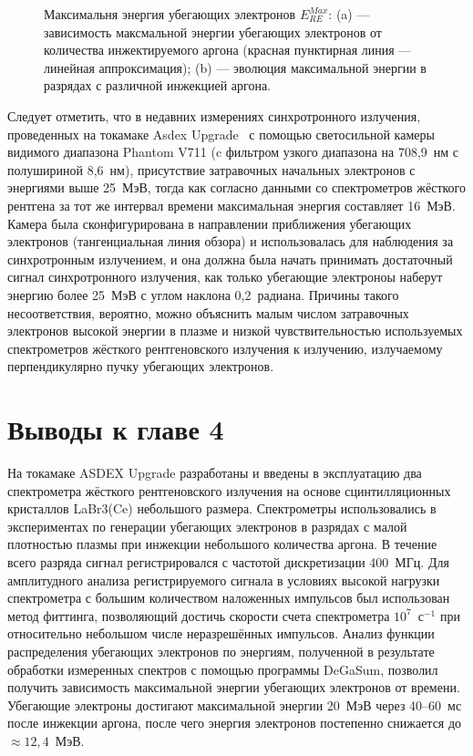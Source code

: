 \begin{figure}[ht!]
  \caption{ Максимальня энергия убегающих электронов $ E_{RE}^{Max}$: (a) --- зависимость максмальной энергии убегающих электронов от количества инжектируемого аргона (красная пунктирная линия --- линейная аппроксимация); (b) --- эволюция максимальной энергии в разрядах с различной инжекцией аргона.~\cite{Shevelev2021} }
  \label{fig:asdexMaxElectronEnergy}
\end{figure}

Следует отметить, что в недавних измерениях синхротронного излучения, проведенных на токамаке Asdex Upgrade~\cite{PazSoldan2017} с помощью светосильной камеры видимого диапазона Phantom V711 (c фильтром узкого диапазона на 708,9~нм с полушириной 8,6~нм), присутствие затравочных начальных электронов с энергиями выше 25~МэВ, тогда как согласно данными со спектрометров жёсткого рентгена за тот же интервал времени  максимальная энергия составляет 16~МэВ. Камера была сконфигурирована в направлении приближения убегающих электронов (тангенциальная линия обзора) и использовалась для наблюдения за синхротронным излучением, и она должна была начать принимать достаточный сигнал синхротронного излучения, как только убегающие электроноы наберут энергию более 25~МэВ с углом наклона 0,2~радиана. Причины такого несоответствия, вероятно, можно объяснить малым числом затравочных электронов высокой энергии в плазме и низкой чувствительностью используемых спектрометров жёсткого рентгеновского излучения к излучению, излучаемому перпендикулярно пучку убегающих электронов.


\section{Выводы к главе 4}

На токамаке ASDEX Upgrade разработаны и введены в эксплуатацию два спектрометра жёсткого рентгеновского излучения на основе сцинтилляционных кристаллов LaBr3(Ce) небольшого размера. Спектрометры использовались в экспериментах по генерации убегающих электронов в разрядах с малой плотностью плазмы при инжекции небольшого количества аргона. В течение всего разряда сигнал регистрировался с частотой дискретизации 400~МГц. Для амплитудного анализа регистрируемого сигнала в условиях высокой нагрузки спектрометра с большим количеством наложенных импульсов был использован метод фиттинга, позволяющий достичь скорости счета спектрометра $10^7$~с${}^{-1}$ при относительно небольшом числе неразрешённых импульсов. Анализ функции распределения убегающих электронов по энергиям, полученной в результате обработки измеренных спектров с помощью программы DeGaSum, позволил получить зависимость максимальной энергии убегающих электронов от времени. Убегающие электроны достигают максимальной энергии 20~МэВ через 40--60~мс после инжекции аргона, после чего энергия электронов постепенно снижается до $\approx{12,4}$~МэВ.


